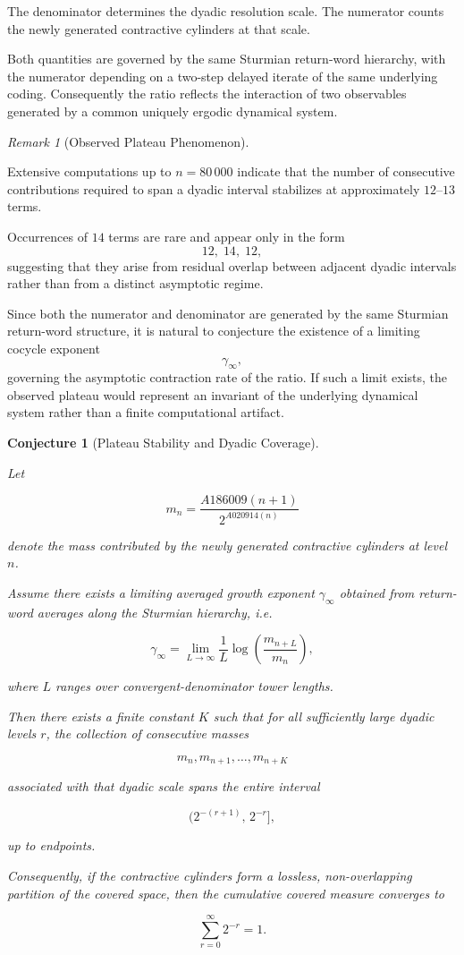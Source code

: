 \documentclass[12pt, oneside]{article}
\numberwithin{equation}{section}
\theoremstyle{definition}
\theoremstyle{plain}
\newtheorem{conjecture}[theorem]{Conjecture}
\theoremstyle{remark}
\newtheorem*{remark}{Remark}
\begin{document}
The denominator determines the dyadic resolution scale. The numerator
counts the newly generated contractive cylinders at that scale.

Both quantities are governed by the same Sturmian return-word hierarchy,
with the numerator depending on a two-step delayed iterate of the same
underlying coding. Consequently the ratio reflects the interaction of
two observables generated by a common uniquely ergodic dynamical system.

\begin{remark}[Observed Plateau Phenomenon]
\label{rem:plateau}

Extensive computations up to $n=80\,000$ indicate that the number of
consecutive contributions required to span a dyadic interval stabilizes
at approximately $12$--$13$ terms.

Occurrences of $14$ terms are rare and appear only in the form
\[
12,\;14,\;12,
\]
suggesting that they arise from residual overlap between adjacent
dyadic intervals rather than from a distinct asymptotic regime.

Since both the numerator and denominator are generated by the same
Sturmian return-word structure, it is natural to conjecture the
existence of a limiting cocycle exponent
\[
\gamma_\infty,
\]
governing the asymptotic contraction rate of the ratio. If such a
limit exists, the observed plateau would represent an invariant of the
underlying dynamical system rather than a finite computational artifact.
\end{remark}

\begin{conjecture}[Plateau Stability and Dyadic Coverage]
\label{conj:plateau}

Let

\[
m_n
=
\frac{A186009(n+1)}
     {2^{A020914(n)}}
\]

denote the mass contributed by the newly generated contractive
cylinders at level \(n\).

Assume there exists a limiting averaged growth exponent
\(\gamma_\infty\) obtained from return-word averages along the
Sturmian hierarchy, i.e.

\[
\gamma_\infty
=
\lim_{L\to\infty}
\frac{1}{L}
\log\!\left(
\frac{m_{n+L}}{m_n}
\right),
\]

where \(L\) ranges over convergent-denominator tower lengths.

Then there exists a finite constant \(K\) such that for all
sufficiently large dyadic levels \(r\), the collection of consecutive
masses

\[
m_n,m_{n+1},\ldots,m_{n+K}
\]

associated with that dyadic scale spans the entire interval

\[
(2^{-(r+1)},\,2^{-r}],
\]

up to endpoints.

Consequently, if the contractive cylinders form a lossless,
non-overlapping partition of the covered space, then the cumulative
covered measure converges to

\[
\sum_{r=0}^{\infty} 2^{-r}
=
1.
\]

\end{conjecture}
\end{document}
